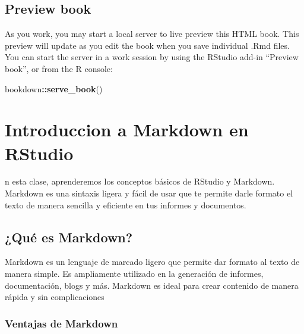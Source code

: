 \documentclass[
]{book}
\newenvironment{Shaded}{\begin{snugshade}}{\end{snugshade}}
\newcommand{\FunctionTok}[1]{\textcolor[rgb]{0.13,0.29,0.53}{\textbf{#1}}}
\newcommand{\NormalTok}[1]{#1}
\newcommand{\SpecialCharTok}[1]{\textcolor[rgb]{0.81,0.36,0.00}{\textbf{#1}}}
\theoremstyle{definition}
\theoremstyle{definition}
\theoremstyle{definition}
\theoremstyle{definition}
\theoremstyle{remark}
\begin{document}
\hypertarget{preview-book}{%
\section*{Preview book}\label{preview-book}}

As you work, you may start a local server to live preview this HTML book. This preview will update as you edit the book when you save individual .Rmd files. You can start the server in a work session by using the RStudio add-in ``Preview book'', or from the R console:

\begin{Shaded}
\begin{Highlighting}[]
\NormalTok{bookdown}\SpecialCharTok{::}\FunctionTok{serve\_book}\NormalTok{()}
\end{Highlighting}
\end{Shaded}

\hypertarget{introduccion-a-markdown-en-rstudio}{%
\chapter*{Introduccion a Markdown en RStudio}\label{introduccion-a-markdown-en-rstudio}}

n esta clase, aprenderemos los conceptos básicos de RStudio y Markdown. Markdown es una sintaxis ligera y fácil de usar que te permite darle formato el texto de manera sencilla y eficiente en tus informes y documentos.

\hypertarget{quuxe9-es-markdown}{%
\section*{¿Qué es Markdown?}\label{quuxe9-es-markdown}}

Markdown es un lenguaje de marcado ligero que permite dar formato al texto de manera simple. Es ampliamente utilizado en la generación de informes, documentación, blogs y más. Markdown es ideal para crear contenido de manera rápida y sin complicaciones

\hypertarget{ventajas-de-markdown}{%
\subsection*{Ventajas de Markdown}\label{ventajas-de-markdown}}
\end{document}
